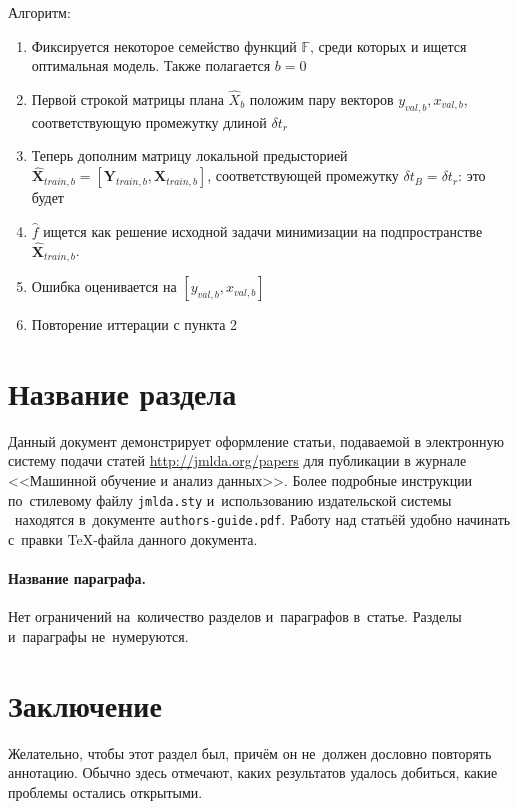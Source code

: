 \documentclass[12pt,twoside]{article}
\begin{document}
	Алгоритм:
\begin{enumerate}
  \item Фиксируется некоторое семейство функций $\mathbb{F}$, среди которых и ищется оптимальная модель. Также полагается $b = 0$
  \item Первой строкой матрицы плана $\hat{X}_b$ положим пару векторов $y_{val, b}, x_{val, b}$, соответствующую промежутку длиной $\delta t_r$
  \item Теперь дополним матрицу локальной предысторией $\hat{\mathbf{X}}_{train, b} =  [ \mathbf{Y}_{train, b},  \mathbf{X}_{train, b}]$, соответствующей промежутку $\delta t_B = \delta t_r$: это будет 

   \item $\hat{f}$ ищется как решение исходной задачи минимизации на подпространстве $\hat{\mathbf{X}}_{train, b}$.

 \item Ошибка оценивается на $[y_{val, b}, x_{val, b}]$

\item Повторение иттерации с пункта 2
\end{enumerate}




\section{Название раздела}
Данный документ демонстрирует оформление статьи,
подаваемой в электронную систему подачи статей \url{http://jmlda.org/papers} для публикации в журнале <<Машинной обучение и анализ данных>>.
Более подробные инструкции по~стилевому файлу \texttt{jmlda.sty}
и~использованию издательской системы \LaTeXe\
находятся в~документе \texttt{authors-guide.pdf}.
Работу над статьёй удобно начинать с~правки \TeX-файла данного документа.

\paragraph{Название параграфа.}
Нет ограничений на~количество разделов и~параграфов в~статье.
Разделы и~параграфы не~нумеруются.


\section{Заключение}
Желательно, чтобы этот раздел был, причём он не~должен дословно повторять аннотацию.
Обычно здесь отмечают,
каких результатов удалось добиться,
какие проблемы остались открытыми.



{}


\end{document}
